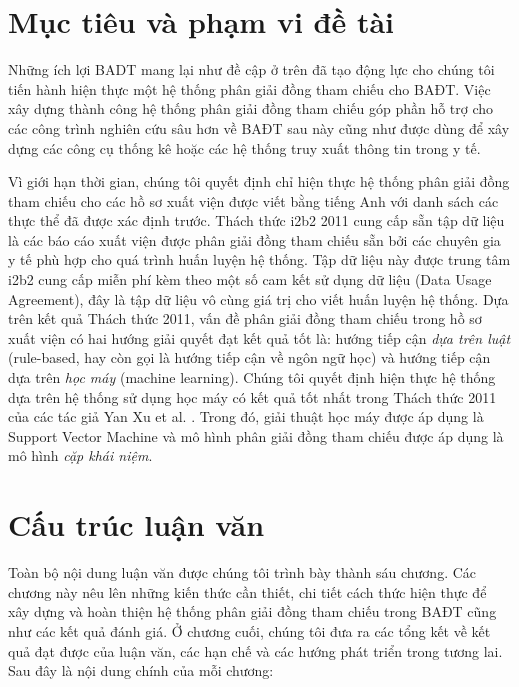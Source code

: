\section{Mục tiêu và phạm vi đề tài}
Những ích lợi BADT mang lại như đề cập ở trên đã tạo động lực cho chúng tôi tiến hành hiện thực một hệ thống phân giải đồng tham chiếu cho BAĐT. Việc xây dựng thành công hệ thống phân giải đồng tham chiếu góp phần hỗ trợ cho các công trình nghiên cứu sâu hơn về BAĐT sau này cũng như được dùng để xây dựng các công cụ thống kê hoặc các hệ thống truy xuất thông tin trong y tế.

Vì giới hạn thời gian, chúng tôi quyết định chỉ hiện thực hệ thống phân giải đồng tham chiếu cho các hồ sơ xuất viện được viết bằng tiếng Anh với danh sách các thực thể đã được xác định trước. Thách thức i2b2 2011 cung cấp sẵn tập dữ liệu là các báo cáo xuất viện được phân giải đồng tham chiếu sẵn bởi các chuyên gia y tế phù hợp cho quá trình huấn luyện hệ thống. Tập dữ liệu này được trung tâm i2b2 cung cấp miễn phí kèm theo một số cam kết sử dụng dữ liệu (Data Usage Agreement), đây là tập dữ liệu vô cùng giá trị cho viết huấn luyện hệ thống. Dựa trên kết quả Thách thức 2011, vấn đề phân giải đồng tham chiếu trong hồ sơ xuất viện có hai hướng giải quyết đạt kết quả tốt là: hướng tiếp cận \emph{dựa trên luật} (rule-based, hay còn gọi là hướng tiếp cận về ngôn ngữ học) và hướng tiếp cận dựa trên \emph{học máy} (machine learning). Chúng tôi quyết định hiện thực hệ thống dựa trên hệ thống sử dụng học máy có kết quả tốt nhất trong Thách thức 2011 của các tác giả Yan Xu et al. \cite{YanXu2012}. Trong đó, giải thuật học máy được áp dụng là Support Vector Machine và mô hình phân giải đồng tham chiếu được áp dụng là mô hình \emph{cặp khái niệm}.

\section{Cấu trúc luận văn}
Toàn bộ nội dung luận văn được chúng tôi trình bày thành sáu chương. Các chương này nêu lên những kiến thức cần thiết, chi tiết cách thức hiện thực để xây dựng và hoàn thiện hệ thống phân giải đồng tham chiếu trong BAĐT cũng như các kết quả đánh giá. Ở chương cuối, chúng tôi đưa ra các tổng kết về kết quả đạt được của luận văn, các hạn chế và các hướng phát triển trong tương lai. Sau đây là nội dung chính của mỗi chương:

